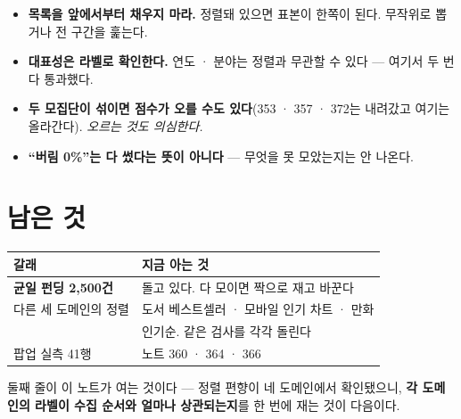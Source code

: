 \documentclass[11pt]{article}
\begin{document}
\begin{itemize}
\item \textbf{목록을 앞에서부터 채우지 마라.} 정렬돼 있으면 표본이
한쪽이 된다. 무작위로 뽑거나 전 구간을 훑는다.
\item \textbf{대표성은 라벨로 확인한다.} 연도 · 분야는 정렬과 무관할 수
있다 --- 여기서 두 번 다 통과했다.
\item \textbf{두 모집단이 섞이면 점수가 오를 수도 있다}(353 · 357 · 372는
내려갔고 여기는 올라간다). \emph{오르는 것도 의심한다.}
\item \textbf{``버림 0\%''는 다 썼다는 뜻이 아니다} --- 무엇을 못 모았는지는
안 나온다.
\end{itemize}

\section{남은 것}

\begin{center}
\begin{tabular}{ll}
\hline
갈래 & 지금 아는 것 \\
\hline
\textbf{균일 펀딩 2,500건} & 돌고 있다. 다 모이면 짝으로 재고 바꾼다 \\
다른 세 도메인의 정렬 & 도서 베스트셀러 · 모바일 인기 차트 · 만화 \\
 & 인기순. 같은 검사를 각각 돌린다 \\
팝업 실측 41행 & 노트 360 · 364 · 366 \\
\hline
\end{tabular}
\end{center}

둘째 줄이 이 노트가 여는 것이다 --- 정렬 편향이 네 도메인에서 확인됐으니,
\textbf{각 도메인의 라벨이 수집 순서와 얼마나 상관되는지}를 한 번에 재는
것이 다음이다.
\end{document}
